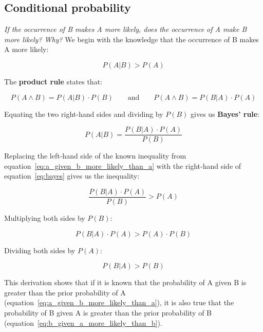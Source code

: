 \subsection{Conditional probability}

\textit{If the occurrence of B makes A more likely, does the occurrence of A make B more likely? Why?}\vspace{0.1cm}
We begin with the knowledge that the occurrence of B makes A more likely:

\begin{equation}
\label{eq:a_given_b_more_likely_than_a}
P(A \vert B) > P(A)
\end{equation}

The \textbf{product rule} states that:

\begin{equation}
P(A \land B) = P(A \vert B) \cdot P(B)
\qquad\text{and}\qquad
P(A \land B) = P(B \vert A) \cdot P(A)
\end{equation}

Equating the two right-hand sides and dividing by $P(B)$ gives us \textbf{Bayes' rule}:

\begin{equation}
\label{eq:bayes}
P(A \vert B) = \frac{P(B \vert A) \cdot P(A)}{P(B)}
\end{equation}

Replacing the left-hand side of the known inequality from equation~\ref{eq:a_given_b_more_likely_than_a} with the right-hand side of equation~\ref{eq:bayes} gives us the inequality:

\begin{equation}
\frac{P(B \vert A) \cdot P(A)}{P(B)} > P(A)
\end{equation}

Multiplying both sides by $P(B)$:

\begin{equation}
P(B \vert A) \cdot P(A) > P(A) \cdot P(B)
\end{equation}

Dividing both sides by $P(A)$:

\begin{equation}
\label{eq:b_given_a_more_likely_than_b}
P(B \vert A) > P(B)
\end{equation}

This derivation shows that if it is known that the probability of A given B is greater than the prior probability of A (equation~\ref{eq:a_given_b_more_likely_than_a}), it is also true that the probability of B given A is greater than the prior probability of B (equation~\ref{eq:b_given_a_more_likely_than_b}).

